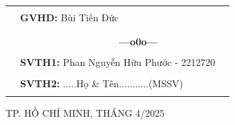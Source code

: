 \documentclass[a4paper]{article}
\theoremstyle{definition}
\begin{document}
\begin{titlepage}
\vspace{0.5cm}
\begin{table}[h]
\begin{tabular}{rll}
\\
\\
\hspace{3 cm} &   \textbf{\Large GVHD:} {\Large Bùi Tiến Đức}
\\
\\
\\
\hspace{3 cm} &     \textbf{$\;$ $\;$$\;$$\;$$\;$$\;$$\;$$\;$$\;$$\;$$\;$$\;$$\;$$\;$$\;$$\;$$\;$$\;$$\;$$\;$$\;$$\;$$\;$$\;$$\;$$\;$$\;$$\;$$\;$$\;$$\;$$\;$$\;$$\;$ \Large ---o0o---} 
\\
\\
\hspace{3 cm} &   \textbf{\Large SVTH1:  } {\Large Phan Nguyễn Hữu Phước - 2212720}
\\
\\
\hspace{3 cm}&   \textbf{\Large SVTH2:  }  {\Large .....Họ \& Tên...........(MSSV)}
\\
\\
\end{tabular}
\end{table}
\vspace{0.5cm}
\begin{center}
{\Large TP. HỒ CHÍ MINH, THÁNG 4/2025 }
\end{center}
\end{titlepage}
\newpage
\newpage
\tableofcontents
\newpage
\listoffigures
\newpage
\listoftables
\newpage
\setcounter{page}{1}


\newpage

\newpage

\newpage

\newpage

\newpage

\end{document}
